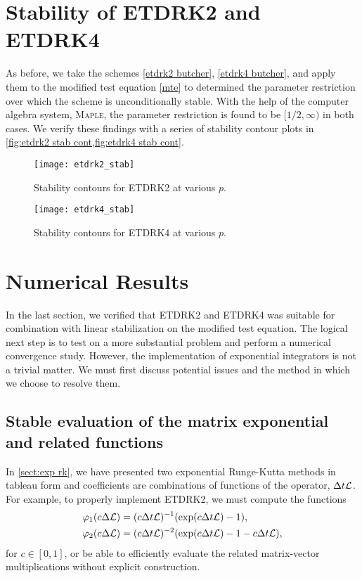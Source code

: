\section{Stability of ETDRK2 and ETDRK4}
As before, we take the schemes \cref{etdrk2 butcher}, \cref{etdrk4 butcher}, and apply them to the modified test equation \cref{mte} to determined the parameter restriction over which the scheme is unconditionally stable. With the help of the computer algebra system, \textsc{Maple}\texttrademark, the parameter restriction is found to be $[1/2,\infty)$ in both cases. We verify these findings with a series of stability contour plots in \cref{fig:etdrk2 stab cont,fig:etdrk4 stab cont}. 

\begin{figure}[htb!]
	\centering
\texttt{[image: etdrk2\_stab]}
\caption{Stability contours for ETDRK2 at various $p$.}
\label{fig:etdrk2 stab cont}
\end{figure}

\begin{figure}[htb!]
	\centering
\texttt{[image: etdrk4\_stab]}
\caption{Stability contours for ETDRK4 at various $p$.}
\label{fig:etdrk4 stab cont}
\end{figure}

\section{Numerical Results}
In the last section, we verified that ETDRK2 and ETDRK4 was suitable for combination with linear stabilization on the modified test equation. The logical next step is to test on a more substantial problem and perform a numerical convergence study. However, the implementation of exponential integrators is not a trivial matter. We must first discuss potential issues and the method in which we choose to resolve them.

\subsection{Stable evaluation of the matrix exponential and related functions}
In \cref{sect:exp rk}, we have presented two exponential Runge-Kutta methods in tableau form and coefficients are combinations of functions of the operator, $\Delta t\mathcal{L}$.  For example, to properly implement ETDRK2, we must compute the functions 
\begin{align}
\varphi_1(c\Delta \mathcal{L}) &= (c\Delta t \mathcal{L})^{-1}(\exp(c\Delta t \mathcal{L}) - 1),
\\
\varphi_2(c\Delta \mathcal{L}) &= (c\Delta t\mathcal{L})^{-2}(\exp(c\Delta t \mathcal{L})  -1 - c\Delta t \mathcal{L}) ,
\end{align}
for $c \in [0,1]$, or be able to efficiently evaluate the related matrix-vector multiplications without explicit construction.

